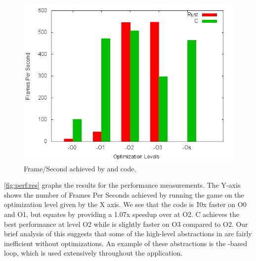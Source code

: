 \begin{figure}[H]
  \begin{center}
    \includegraphics[scale=0.5]{results/plots/perf/perf.png}
  \end{center}
  \caption{Frame/Second achieved by {\rust} and {\C} code.}
  \label{fig:perf:res}
\end{figure}

\autoref{fig:perf:res} graphs the results for the performance measurements.
The Y-axis shows the number of Frames Per Seconds achieved by running the game on the optimization level given by the X axis.
We see that the {\C} code is \~10x faster on O0 and O1, but {\rust} equates by providing a 1.07x speedup over {\C} at O2.
C achieves the best performance at level O2 while {\rust} is slightly faster on O3 compared to O2.
Our brief analysis of this suggests that some of the high-level abstractions in {\rust} are fairly inefficient without optimizations.
An example of these abstractions is the -based  loop, which is used extensively throughout the {\cg} application.

